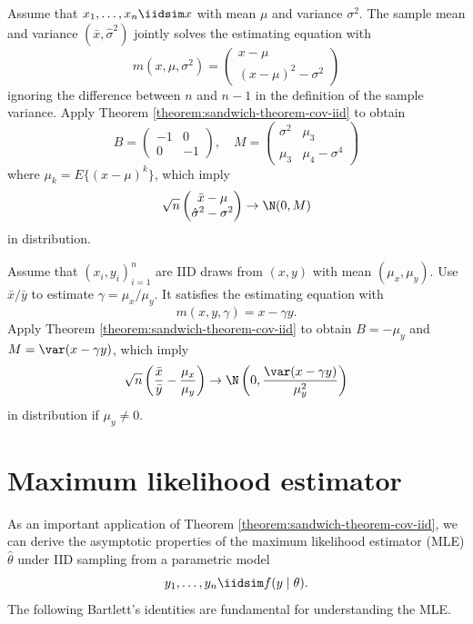 \begin{example}
\label{eg::sample-meanandvariance}
Assume that $x_1,\ldots, x_n \iidsim x$ with mean $\mu$ and variance $\sigma^2$. The sample mean and variance $(\bar{x}, \hat{\sigma}^2)$ jointly solves the estimating equation with
$$
m(x, \mu, \sigma^2) = \begin{pmatrix}
x - \mu \\
(x-\mu)^2 - \sigma^2
\end{pmatrix}
$$
ignoring the difference between $n$ and $n-1$ in the definition of the sample variance. Apply Theorem \ref{theorem:sandwich-theorem-cov-iid} to obtain 
$$
B = \begin{pmatrix}
-1 & 0 \\ 
0 & -1
\end{pmatrix},\quad
M = \begin{pmatrix}
\sigma^2 & \mu_3 \\
\mu_3 & \mu_4 - \sigma^4
\end{pmatrix}
$$
where $\mu_k = E\{ (x-\mu)^k\}$, which imply 
$$
\sqrt{n} \begin{pmatrix}
\bar{x} - \mu \\
\hat{\sigma}^2 - \sigma^2
\end{pmatrix} \rightarrow 
\N(0, M)
$$
in distribution. 
\end{example}




\begin{example}
Assume that $(x_i, y_i)_{i=1}^n$ are IID draws from $(x,y)$ with mean $(\mu_x, \mu_y)$. Use $\bar{x} / \bar{y}$ to estimate $\gamma = \mu_x / \mu_y$. It satisfies the estimating equation with 
$$
m(x,y,\gamma) = x - \gamma y .
$$
Apply Theorem \ref{theorem:sandwich-theorem-cov-iid} to obtain $B = -\mu_y$ and $M = \var(x-\gamma y)$, which imply 
$$
\sqrt{n} \left(   \frac{ \bar{x} }{ \bar{y} }  - \frac{ \mu_x }{   \mu_y }  \right)
\rightarrow
\N\left(0,   \frac{  \var(x-\gamma y) }{  \mu_y^2  }   \right)
$$
in distribution if $\mu_y \neq 0$. 
\end{example}


 
\section{Maximum likelihood estimator}\label{sec::mle}

As an important application of Theorem \ref{theorem:sandwich-theorem-cov-iid}, we can derive the asymptotic properties of the maximum likelihood estimator (MLE) $\hat{\theta}$ under \textup{IID} sampling from a parametric model 
$$
 y_1,\ldots, y_n \iidsim  f(y\mid \theta).
 $$
The following Bartlett's identities are fundamental for understanding the MLE. 


